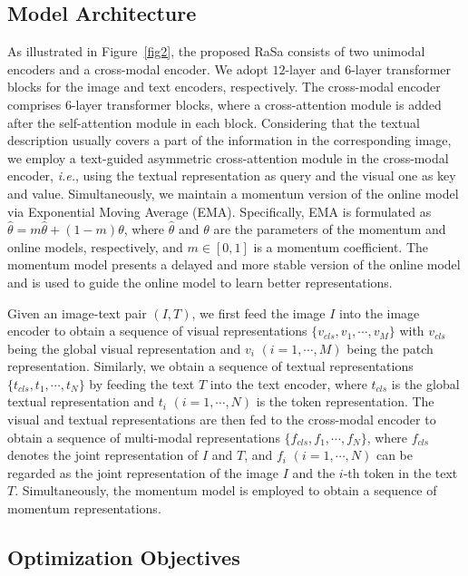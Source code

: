 \documentclass{article}
\begin{document}
\subsection{Model Architecture}
\label{MA}
As illustrated in Figure~\ref{fig2}, the proposed RaSa consists of two unimodal encoders and a cross-modal encoder.
We adopt $12$-layer and $6$-layer transformer blocks for the image and text encoders, respectively.
The cross-modal encoder comprises $6$-layer transformer blocks, where a cross-attention module is added after the self-attention module in each block.
Considering that the textual description usually covers a part of the information in the corresponding image, we employ a text-guided asymmetric cross-attention module in the cross-modal encoder, \emph{i.e.}, using the textual representation as query and the visual one as key and value.
Simultaneously, we maintain a momentum version of the online model via Exponential Moving Average (EMA).
Specifically, EMA is formulated as $\hat{\theta} = m\hat{\theta} + (1-m)\theta$, where $\hat{\theta}$ and $\theta$ are the parameters of the momentum and online models, respectively, and $m \in [0, 1]$ is a momentum coefficient.
The momentum model presents a delayed and more stable version of the online model and is used to guide the online model to learn better representations. 

Given an image-text pair $(I, T)$, we first feed the image $I$ into the image encoder to obtain a sequence of visual representations $\{v_{cls}, v_1,\cdots,v_M\}$ with $v_{cls}$ being the global visual representation and $v_i$ $(i=1,\cdots,M)$ being the patch representation.
Similarly, we obtain a sequence of textual representations $\{t_{cls}, t_1,\cdots,t_N\}$ by feeding the text $T$ into the text encoder, where $t_{cls}$ is the global textual representation and $t_i$ $(i=1,\cdots,N)$ is the token representation.
The visual and textual representations are then fed to the cross-modal encoder to obtain a sequence of multi-modal representations $\{f_{cls}, f_1,\cdots,f_N\}$, where $f_{cls}$ denotes the joint representation of $I$ and $T$, and $f_i$ $(i=1,\cdots,N)$ can be regarded as the joint representation of the image $I$ and the $i$-th token in the text $T$. 
Simultaneously, the momentum model is employed to obtain a sequence of momentum representations.

\subsection{Optimization Objectives}
\label{OB}
\end{document}
